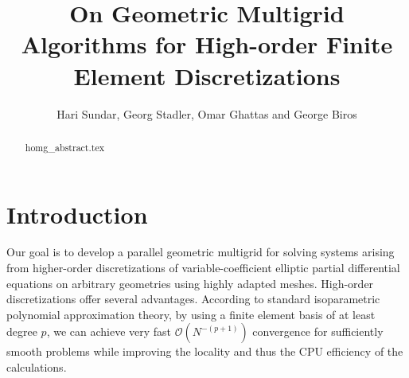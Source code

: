 \documentclass[times]{nlaauth}
\begin{document}

\title{On Geometric Multigrid Algorithms for High-order Finite Element Discretizations}

\author{Hari Sundar\corrauth, Georg Stadler, Omar Ghattas and George Biros}

\address{Institute for Computational Engineering \& Sciences, University of Texas, Austin, TX 78712}


\begin{abstract}
 {homg_abstract.tex}
\end{abstract}


\maketitle


\section{Introduction}


Our goal is to develop a parallel geometric multigrid for solving
systems arising from higher-order discretizations of
variable-coefficient elliptic partial differential equations on
arbitrary geometries using highly adapted meshes.
High-order discretizations offer several advantages.  According to
standard isoparametric polynomial approximation theory,
by using a finite element basis of at least degree $p$, we can achieve
very fast $\mathcal{O}(N^{-(p+1)})$ convergence for sufficiently
smooth problems while improving the locality and thus the CPU
efficiency of the calculations.
\end{document}
